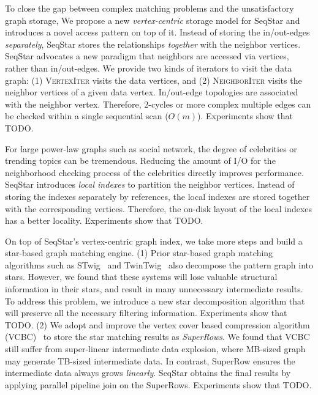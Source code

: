 To close the gap between complex matching problems and the unsatisfactory graph storage,
We propose a new \emph{vertex-centric} storage model for SeqStar and introduces a novel access pattern on top of it.
Instead of storing the in/out-edges \emph{separately}, SeqStar stores the relationships \emph{together} with the neighbor vertices.
SeqStar advocates a new paradigm that neighbors are accessed via vertices, rather than in/out-edges.
We provide two kinds of iterators to visit the data graph:
(1) \textsc{VertexIter} visits the data vertices, and (2) \textsc{NeighborIter} visits the neighbor vertices of a given data vertex.
In/out-edge topologies are associated with the neighbor vertex.
Therefore, 2-cycles or more complex multiple edges can be checked within a single sequential scan ($O(m)$).
Experiments show that TODO\@.

For large power-law graphs such as social network, the degree of celebrities or trending topics can be tremendous.
Reducing the amount of I/O for the neighborhood checking process of the celebrities directly improves performance.
SeqStar introduces \emph{local indexes} to partition the neighbor vertices.
Instead of storing the indexes separately by references, the local indexes are stored together with the corresponding vertices.
Therefore, the on-disk layout of the local indexes has a better locality.
Experiments show that TODO\@.

On top of SeqStar's vertex-centric graph index, we take more steps and build a star-based graph matching engine.
(1) Prior star-based graph matching algorithms such as STwig~\cite{DBLP:journals/pvldb/SunWWSL12} and TwinTwig~\cite{DBLP:journals/pvldb/LaiQLC15} also decompose the pattern graph into stars.
However, we found that these systems will lose valuable structural information in their stars, and result in many unnecessary intermediate results.
To address this problem, we introduce a new star decomposition algorithm that will preserve all the necessary filtering information.
Experiments show that TODO\@.
(2) We adopt and improve the vertex cover based compression algorithm (VCBC)~\cite{DBLP:journals/pvldb/QiaoZC17} to store the star matching results as \emph{SuperRows}.
We found that VCBC still suffer from super-linear intermediate data explosion, where MB-sized graph may generate TB-sized intermediate data.
In contrast, SuperRow ensures the intermediate data always grows \emph{linearly}.
SeqStar obtains the final results by applying parallel pipeline join on the SuperRows.
Experiments show that TODO\@.

